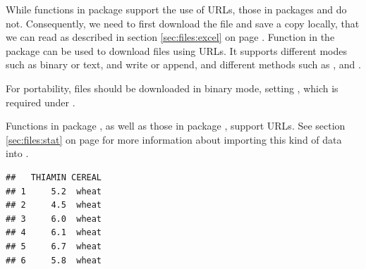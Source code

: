 \documentclass[krantz2]{krantz}\usepackage{knitr}
\begin{document}
While functions in package  support the use of URLs, those in packages  and  do not. Consequently, we need to first download the file and save a copy locally, that we can read as described in section \ref{sec:files:excel} on page \pageref{sec:files:excel}. Function  in the \Rlang {} package can be used to download files using URLs. It supports different modes such as binary or text, and write or append, and different methods such as ,  and .

\begin{warningbox}
For portability,  files should be downloaded in binary mode, setting , which is required under .
\end{warningbox}


\begin{knitrout}\footnotesize
{}\color{fgcolor}\begin{kframe}
\begin{alltt}
\hlstd{(}\hlstd{,}
              \hlstd{,}
               \hlstd{=} \hlstd{)}
\end{alltt}
\end{kframe}
\end{knitrout}

Functions in package , as well as those in package , support URLs. See section \ref{sec:files:stat} on page \pageref{sec:files:stat} for more information about importing this kind of data into \Rlang.

\begin{knitrout}\footnotesize
{}\color{fgcolor}\begin{kframe}
\begin{alltt}
 \hlkwb{<-}
  \hlstd{(} \hlstd{=} \hlstd{,}
             \hlstd{=} \hlstd{)}
\end{alltt}
\begin{verbatim}
##   THIAMIN CEREAL
## 1     5.2  wheat
## 2     4.5  wheat
## 3     6.0  wheat
## 4     6.1  wheat
## 5     6.7  wheat
## 6     5.8  wheat
\end{verbatim}
\end{kframe}
\end{knitrout}
\end{document}
